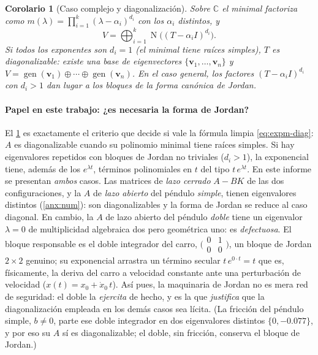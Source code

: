 \documentclass[11pt,letterpaper]{article}
\theoremstyle{definition}
\theoremstyle{plain}
\newtheorem{corolario}[definicion]{Corolario}
\theoremstyle{remark}
\DeclareMathOperator{\nuc}{N}
\DeclareMathOperator{\gen}{gen}
\newcommand{\C}{\mathbb{C}}
\begin{document}
\begin{corolario}[Caso complejo y diagonalización]
\label{cor:jordan}
Sobre $\C$ el minimal factoriza como
$m(\lambda)=\prod_{i=1}^{k}(\lambda-\alpha_i)^{d_i}$ con los $\alpha_i$
distintos, y
\begin{equation}\label{eq:primaria-C}
  V=\bigoplus_{i=1}^{k}\nuc\!\bigl((T-\alpha_i I)^{d_i}\bigr).
\end{equation}
Si todos los exponentes son $d_i=1$ (el minimal tiene raíces
\emph{simples}), $T$ es \emph{diagonalizable}: existe una base de
eigenvectores $\{\bm v_1,\dots,\bm v_n\}$ y
$V=\gen(\bm v_1)\oplus\cdots\oplus\gen(\bm v_n)$. En el caso general, los
factores $(T-\alpha_i I)^{d_i}$ con $d_i>1$ dan lugar a los bloques de la
\emph{forma canónica de Jordan}.
\end{corolario}

\paragraph{Papel en este trabajo: ¿es necesaria la forma de Jordan?} El
\cref{cor:jordan} es exactamente el criterio que decide si vale la
fórmula limpia \cref{eq:expm-diag}: $A$ es diagonalizable cuando su
polinomio minimal tiene raíces simples. Si hay eigenvalores repetidos con
bloques de Jordan no triviales ($d_i>1$), la exponencial tiene, además de
los $e^{\lambda t}$, términos polinomiales en $t$ del tipo
$t\,e^{\lambda t}$. En este informe se presentan \emph{ambos} casos. Las
matrices de \emph{lazo cerrado} $A-BK$ de las dos configuraciones, y la
$A$ de \emph{lazo abierto} del péndulo \emph{simple}, tienen eigenvalores
distintos (\cref{anx:num}): son diagonalizables y la forma de Jordan se
reduce al caso diagonal. En cambio, la $A$ de lazo abierto del péndulo
\emph{doble} tiene un eigenvalor $\lambda=0$ de multiplicidad algebraica
dos pero geométrica uno: es \emph{defectuosa}. El bloque responsable es el
doble integrador del carro,
$\bigl(\begin{smallmatrix}0&1\\0&0\end{smallmatrix}\bigr)$, un bloque de
Jordan $2\times2$ genuino; su exponencial arrastra un término secular
$t\,e^{0\cdot t}=t$ que es, físicamente, la deriva del carro a velocidad
constante ante una perturbación de velocidad ($x(t)=x_0+\dot x_0\,t$). Así
pues, la maquinaria de Jordan no es mera red de seguridad: el doble la
\emph{ejercita} de hecho, y es la que \emph{justifica} que la
diagonalización empleada en los demás casos sea lícita. (La fricción del
péndulo simple, $b\neq0$, parte ese doble integrador en dos eigenvalores
distintos $\{0,-0.077\}$, y por eso su $A$ sí es diagonalizable; el doble,
sin fricción, conserva el bloque de Jordan.)
\end{document}
